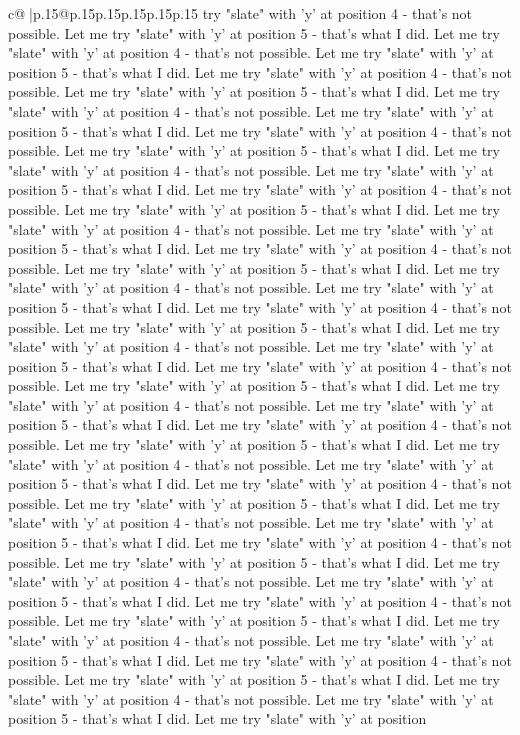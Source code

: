\documentclass{article}
\begin{document}
{\begin{supertabular}{c@{$\;$}|p{.15\linewidth}@{}p{.15\linewidth}p{.15\linewidth}p{.15\linewidth}p{.15\linewidth}p{.15\linewidth}}
{{{try "slate" with 'y' at position 4 {-} that's not possible. Let me try "slate" with 'y' at position 5 {-} that's what I did. Let me try "slate" with 'y' at position 4 {-} that's not possible. Let me try "slate" with 'y' at position 5 {-} that's what I did. Let me try "slate" with 'y' at position 4 {-} that's not possible. Let me try "slate" with 'y' at position 5 {-} that's what I did. Let me try "slate" with 'y' at position 4 {-} that's not possible. Let me try "slate" with 'y' at position 5 {-} that's what I did. Let me try "slate" with 'y' at position 4 {-} that's not possible. Let me try "slate" with 'y' at position 5 {-} that's what I did. Let me try "slate" with 'y' at position 4 {-} that's not possible. Let me try "slate" with 'y' at position 5 {-} that's what I did. Let me try "slate" with 'y' at position 4 {-} that's not possible. Let me try "slate" with 'y' at position 5 {-} that's what I did. Let me try "slate" with 'y' at position 4 {-} that's not possible. Let me try "slate" with 'y' at position 5 {-} that's what I did. Let me try "slate" with 'y' at position 4 {-} that's not possible. Let me try "slate" with 'y' at position 5 {-} that's what I did. Let me try "slate" with 'y' at position 4 {-} that's not possible. Let me try "slate" with 'y' at position 5 {-} that's what I did. Let me try "slate" with 'y' at position 4 {-} that's not possible. Let me try "slate" with 'y' at position 5 {-} that's what I did. Let me try "slate" with 'y' at position 4 {-} that's not possible. Let me try "slate" with 'y' at position 5 {-} that's what I did. Let me try "slate" with 'y' at position 4 {-} that's not possible. Let me try "slate" with 'y' at position 5 {-} that's what I did. Let me try "slate" with 'y' at position 4 {-} that's not possible. Let me try "slate" with 'y' at position 5 {-} that's what I did. Let me try "slate" with 'y' at position 4 {-} that's not possible. Let me try "slate" with 'y' at position 5 {-} that's what I did. Let me try "slate" with 'y' at position 4 {-} that's not possible. Let me try "slate" with 'y' at position 5 {-} that's what I did. Let me try "slate" with 'y' at position 4 {-} that's not possible. Let me try "slate" with 'y' at position 5 {-} that's what I did. Let me try "slate" with 'y' at position 4 {-} that's not possible. Let me try "slate" with 'y' at position 5 {-} that's what I did. Let me try "slate" with 'y' at position 4 {-} that's not possible. Let me try "slate" with 'y' at position 5 {-} that's what I did. Let me try "slate" with 'y' at position 4 {-} that's not possible. Let me try "slate" with 'y' at position 5 {-} that's what I did. Let me try "slate" with 'y' at position 4 {-} that's not possible. Let me try "slate" with 'y' at position 5 {-} that's what I did. Let me try "slate" with 'y' at position 4 {-} that's not possible. Let me try "slate" with 'y' at position 5 {-} that's what I did. Let me try "slate" with 'y' at position 4 {-} that's not possible. Let me try "slate" with 'y' at position 5 {-} that's what I did. Let me try "slate" with 'y' at position 4 {-} that's not possible. Let me try "slate" with 'y' at position 5 {-} that's what I did. Let me try "slate" with 'y' at position }}}
\end{supertabular}}
\end{document}
